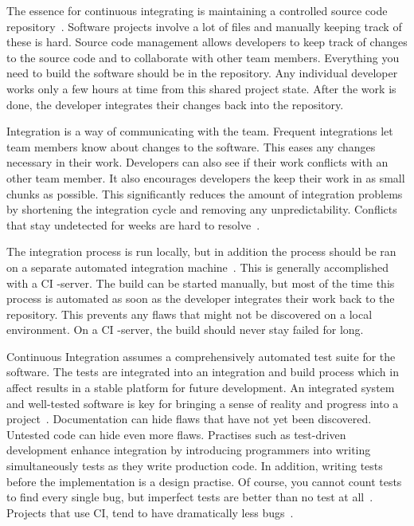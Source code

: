 \documentclass[english]{tktltiki2}
\begin{document}
The essence for continuous integrating is maintaining a controlled source code repository~\cite{Fow06}. Software projects involve a lot of files and manually keeping track of these is hard. Source code management allows developers to keep track of changes to the source code and to collaborate with other team members. Everything you need to build the software should be in the repository. Any individual developer works only a few hours at time from this shared project state. After the work is done, the developer integrates their changes back into the repository.

Integration is a way of communicating with the team. Frequent integrations let team members know about changes to the software. This eases any changes necessary in their work. Developers can also see if their work conflicts with an other team member. It also encourages developers the keep their work in as small chunks as possible. This significantly reduces the amount of integration problems by shortening the integration cycle and removing any unpredictability. Conflicts that stay undetected for weeks are hard to resolve~\cite{Fow06}.

The integration process is run locally, but in addition the process should be ran on a separate automated integration machine~\cite{Fow06}. This is generally accomplished with a CI -server. The build can be started manually, but most of the time this process is automated as soon as the developer integrates their work back to the repository. This prevents any flaws that might not be discovered on a local environment. On a CI -server, the build should never stay failed for long.

Continuous Integration assumes a comprehensively automated test suite for the software. The tests are integrated into an integration and build process which in affect results in a stable platform for future development. An integrated system and well-tested software is key for bringing a sense of reality and progress into a project~\cite{Fow05}. Documentation can hide flaws that have not yet been discovered. Untested code can hide even more flaws. Practises such as test-driven development enhance integration by introducing programmers into writing simultaneously tests as they write production code. In addition, writing tests before the implementation is a design practise. Of course, you cannot count tests to find every single bug, but imperfect tests are better than no test at all~\cite{Fow06}. Projects that use CI, tend to have dramatically less bugs~\cite{Fow06}.
\end{document}
